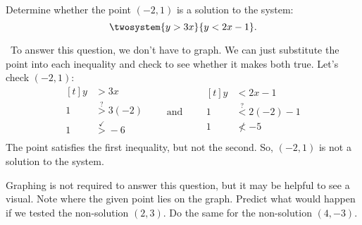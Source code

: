 \begin{boxedex}

Determine whether the point $(-2, 1)$ is a solution to the system: \[\twosystem{y > 3x}{y < 2x-1}.\]

\exsoln\ To answer this question, we don't have to graph. We can just substitute the point into each inequality and check to see whether it makes both true. Let's check $(-2,1)$:
\[
\begin{aligned}[t]
y		&>3x\\
1		&\overset{?}{>}3(-2)\\
1 		&\overset{\checkmark}{>} -6\\
\end{aligned}
\qquad\text{and}\qquad
\begin{aligned}[t]
y 	&< 2x-1\\
1	&\overset{?}{<} 2(-2)-1\\
1	&{\nless} -5\\
\end{aligned}
\]
The point satisfies the first inequality, but not the second. So, $(-2,1)$ is not a solution to the system.

Graphing is not required to answer this question, but it may be helpful to see a visual. Note where the given point lies on the graph. Predict what would happen if we tested the non-solution $(2,3)$. Do the same for the non-solution $(4,-3)$.
\begin{center}
\end{center}
\end{boxedex}

